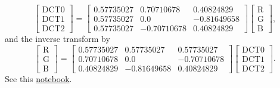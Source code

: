 \begin{equation}
  \begin{bmatrix}
    \text{DCT0} \\
    \text{DCT1} \\
    \text{DCT2}
  \end{bmatrix}
  =
  \begin{bmatrix}
    0.57735027 & 0.70710678 & 0.40824829 \\
    0.57735027 & 0.0 & -0.81649658 \\
    0.57735027 & -0.70710678 & 0.40824829
  \end{bmatrix}
  \begin{bmatrix}
    \text{R} \\
    \text{G} \\
    \text{B}
  \end{bmatrix},
\end{equation}
and the inverse transform by
\begin{equation}
  \begin{bmatrix}
    \text{R} \\
    \text{G} \\
    \text{B}
  \end{bmatrix}
  =
  \begin{bmatrix}
    0.57735027 & 0.57735027 & 0.57735027 \\
    0.70710678 & 0.0 & -0.70710678 \\
    0.40824829 & -0.81649658 & 0.40824829
  \end{bmatrix}
  \begin{bmatrix}
    \text{DCT0} \\
    \text{DCT1} \\
    \text{DCT2}
  \end{bmatrix}.
\end{equation}
See this \href{https://github.com/Sistemas-Multimedia/Sistemas-Multimedia.github.io/blob/master/milestones/06-YUV_compression/color-DCT_matrix.ipynb}{notebook}.

